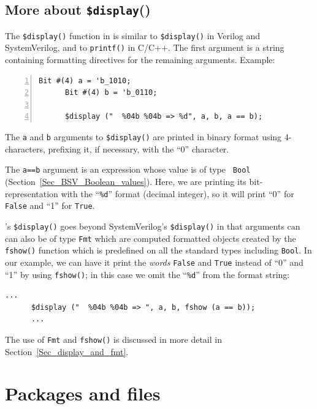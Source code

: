\subsection{More about {\tt \$display}()}

\label{BSV_display}

The \verb|$display()| function in {\BSV} is similar to
\verb|$display()| in Verilog and SystemVerilog, and to \verb|printf()|
in C/C++. The first argument is a string containing formatting
directives for the remaining arguments. Example:

{\footnotesize
\begin{Verbatim}[frame=single, numbers=left]
      Bit #(4) a = 'b_1010;
      Bit #(4) b = 'b_0110;

      $display ("  %04b %04b => %d", a, b, a == b);
\end{Verbatim}
}

The {\tt a} and {\tt b} arguments to \verb|$display()| are printed in
binary format using 4-characters, prefixing it, if necessary, with the
``0'' character.

The {\tt a==b} argument is an expression whose value is of type {\tt
Bool} (Section~\ref{Sec_BSV_Boolean_values}).  Here, we are printing
its bit-representation with the ``\verb|%d|'' format (decimal
integer), so it will print ``0'' for \verb|False| and ``1'' for
\verb|True|.

{\BSV}'s \verb|$display()| goes beyond SystemVerilog's
\verb|$display()| in that arguments can can also be of type \verb|Fmt|
which are computed formatted objects created by the \verb|fshow()|
function which is predefined on all the standard types including
\verb|Bool|.  In our example, we can have it print the \emph{words}
\verb|False| and \verb|True| instead of ``0'' and ``1'' by using
\verb|fshow()|; in this case we omit the ``\verb|%d|'' from the format
string:

{\footnotesize
\begin{Verbatim}[frame=single]
      ...
      $display ("  %04b %04b => ", a, b, fshow (a == b));
      ...
\end{Verbatim}
}

The use of \verb|Fmt| and \verb|fshow()| is discussed in more detail
in Section~\ref{Sec_display_and_fmt}.


\section{Packages and files}

